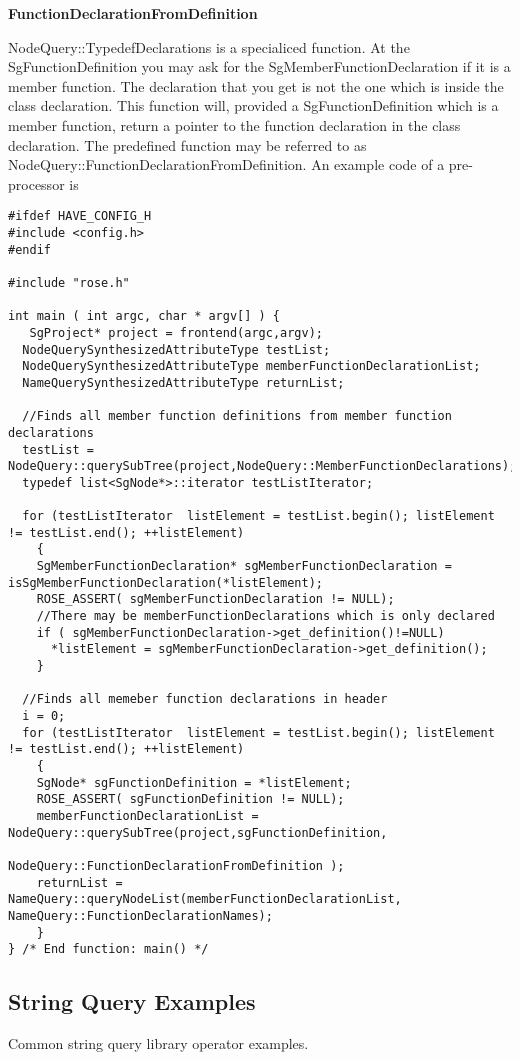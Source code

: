 {\textbf{FunctionDeclarationFromDefinition}

NodeQuery::TypedefDeclarations is a specialiced function. At the
SgFunctionDefinition you may ask for the SgMemberFunctionDeclaration
if it is a member function. The declaration that you get is not the
one which is inside the class declaration. This function will,
provided a SgFunctionDefinition which is a member function, return a
pointer to the function declaration in the class declaration. The
predefined function may be referred to as
NodeQuery::FunctionDeclarationFromDefinition. An example code of a
pre-processor is
\begin{verbatim}
#ifdef HAVE_CONFIG_H
#include <config.h>
#endif

#include "rose.h"

int main ( int argc, char * argv[] ) {
   SgProject* project = frontend(argc,argv);
  NodeQuerySynthesizedAttributeType testList;
  NodeQuerySynthesizedAttributeType memberFunctionDeclarationList; 
  NameQuerySynthesizedAttributeType returnList;
 
  //Finds all member function definitions from member function declarations 
  testList = NodeQuery::querySubTree(project,NodeQuery::MemberFunctionDeclarations);
  typedef list<SgNode*>::iterator testListIterator;
  
  for (testListIterator  listElement = testList.begin(); listElement != testList.end(); ++listElement) 
    {
    SgMemberFunctionDeclaration* sgMemberFunctionDeclaration = isSgMemberFunctionDeclaration(*listElement);
    ROSE_ASSERT( sgMemberFunctionDeclaration != NULL);
    //There may be memberFunctionDeclarations which is only declared
    if ( sgMemberFunctionDeclaration->get_definition()!=NULL)
      *listElement = sgMemberFunctionDeclaration->get_definition();
    }

  //Finds all memeber function declarations in header 
  i = 0;
  for (testListIterator  listElement = testList.begin(); listElement != testList.end(); ++listElement) 
    {
    SgNode* sgFunctionDefinition = *listElement;
    ROSE_ASSERT( sgFunctionDefinition != NULL);
    memberFunctionDeclarationList = NodeQuery::querySubTree(project,sgFunctionDefinition, 
                                        NodeQuery::FunctionDeclarationFromDefinition );
    returnList = NameQuery::queryNodeList(memberFunctionDeclarationList, NameQuery::FunctionDeclarationNames);
    }
} /* End function: main() */
\end{verbatim}
 
\subsection{String Query Examples}
   Common string query library operator examples.



}
